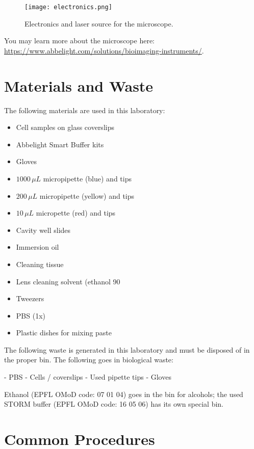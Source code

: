 \documentclass[10pt,a4paper,oneside]{book}
\begin{document}
\begin{figure}[ht]
    \centering
    \texttt{[image: electronics.png]}
    \caption{Electronics and laser source for the microscope.}
    \label{fig:electronics}
\end{figure}

You may learn more about the microscope here: \url{https://www.abbelight.com/solutions/bioimaging-instruments/}.

\section{Materials and Waste}

The following materials are used in this laboratory:

\begin{itemize}
  \item Cell samples on glass coverslips
  \item Abbelight Smart Buffer kits
  \item Gloves
  \item $1000 \, \mu L$ micropipette (blue) and tips
  \item $200 \, \mu L$ micropipette (yellow) and tips
  \item $10 \, \mu L$ micropette (red) and tips
  \item Cavity well slides
  \item Immersion oil
  \item Cleaning tissue
  \item Lens cleaning solvent (ethanol 90%
  \item Tweezers
  \item  PBS (1x)
  \item Plastic dishes for mixing paste
\end{itemize}

The following waste is generated in this laboratory and must be disposed of in the proper bin. The following goes in biological waste:

\begin{itemize}
    - PBS
    - Cells / coverslips
    - Used pipette tips
    - Gloves
\end{itemize}

Ethanol (EPFL OMoD code: 07 01 04) goes in the bin for alcohols; the used STORM buffer (EPFL OMoD code: 16 05 06) has its own special bin.

\section{Common Procedures}
\end{document}
